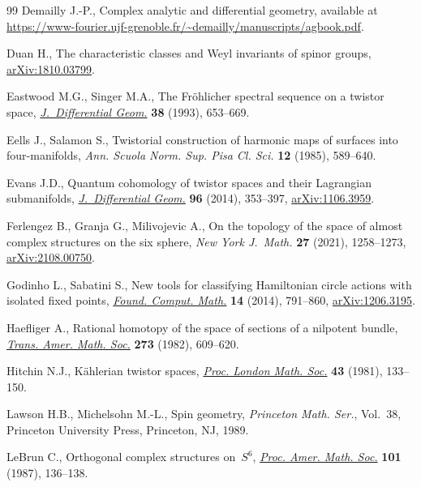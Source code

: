 \documentclass[pdftex]{sigma}%
\numberwithin{equation}{section}
\begin{document}
\begin{thebibliography}{99}
Demailly J.-P., Complex analytic and differential geometry, available at
 \url{https://www-fourier.ujf-grenoble.fr/~demailly/manuscripts/agbook.pdf}.

Duan H., The characteristic classes and {W}eyl invariants of spinor groups,
 \href{https://arxiv.org/abs/1810.03799}{arXiv:1810.03799}.

Eastwood M.G., Singer M.A., The {F}r\"ohlicher spectral sequence on a twistor
 space, \href{https://doi.org/10.4310/jdg/1214454485}{\textit{J.~Differential Geom.}} \textbf{38} (1993), 653--669.

Eells J., Salamon S., Twistorial construction of harmonic maps of surfaces into
 four-manifolds, \textit{Ann. Scuola Norm. Sup. Pisa Cl. Sci.} \textbf{12}
 (1985), 589--640.

Evans J.D., Quantum cohomology of twistor spaces and their {L}agrangian
 submanifolds, \href{https://doi.org/10.4310/jdg/1395321845}{\textit{J.~Differential Geom.}} \textbf{96} (2014), 353--397,
 \href{https://arxiv.org/abs/1106.3959}{arXiv:1106.3959}.

Ferlengez B., Granja G., Milivojevic A., On the topology of the space of almost
 complex structures on the six sphere, \textit{New York J.~Math.} \textbf{27}
 (2021), 1258--1273, \href{https://arxiv.org/abs/2108.00750}{arXiv:2108.00750}.

Godinho L., Sabatini S., New tools for classifying {H}amiltonian circle actions
 with isolated fixed points, \href{https://doi.org/10.1007/s10208-014-9204-1}{\textit{Found. Comput. Math.}} \textbf{14} (2014),
 791--860, \href{https://arxiv.org/abs/1206.3195}{arXiv:1206.3195}.

Haefliger A., Rational homotopy of the space of sections of a nilpotent bundle,
 \href{https://doi.org/10.2307/1999931}{\textit{Trans. Amer. Math. Soc.}} \textbf{273} (1982), 609--620.

Hitchin N.J., K\"ahlerian twistor spaces, \href{https://doi.org/10.1112/plms/s3-43.1.133}{\textit{Proc. London Math. Soc.}}
 \textbf{43} (1981), 133--150.

Lawson H.B., Michelsohn M.-L., Spin geometry, \textit{Princeton Math. Ser.},
 Vol.~38, Princeton University Press, Princeton, NJ, 1989.

LeBrun C., Orthogonal complex structures on~{$S^6$}, \href{https://doi.org/10.2307/2046564}{\textit{Proc. Amer. Math.
 Soc.}} \textbf{101} (1987), 136--138.


\end{thebibliography}
\end{document}
